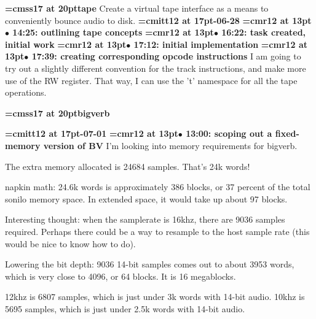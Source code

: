 {\medskip\noindent\bf\font\titlefont=cmss17 at 20pt\titlefont tape}\medskip
Create a virtual tape interface as a means to
conveniently bounce audio to disk.
{\medskip\noindent\bf\font\titlefont=cmitt12 at 17pt-06-28}\medskip
{\smallskip\noindent\bf\font\titlefont=cmr12 at 13pt\titlefont $\bullet$ 14:25: outlining tape concepts}\smallskip
{\smallskip\noindent\bf\font\titlefont=cmr12 at 13pt\titlefont $\bullet$ 16:22: task created, initial work}\smallskip
{\smallskip\noindent\bf\font\titlefont=cmr12 at 13pt\titlefont $\bullet$ 17:12: initial implementation}\smallskip
{\smallskip\noindent\bf\font\titlefont=cmr12 at 13pt\titlefont $\bullet$ 17:39: creating corresponding opcode instructions}\smallskip
I am going to try out a slightly different convention for the track instructions, and make more use of the RW register. That way, I can use the 't' namespace for all the tape operations.
\par

{\medskip\noindent\bf\font\titlefont=cmss17 at 20pt\titlefont bigverb}\medskip

{\medskip\noindent\bf\font\titlefont=cmitt12 at 17pt-07-01}\medskip
{\smallskip\noindent\bf\font\titlefont=cmr12 at 13pt\titlefont $\bullet$ 13:00: scoping out a fixed-memory version of BV}\smallskip
I'm looking into memory requirements for bigverb.
\par

The extra memory allocated is 24684 samples. That's 24k words!
\par

napkin math: 24.6k words is approximately 386 blocks, or 37 percent of the total sonilo memory space. In extended space, it would take up about 97 blocks.
\par

Interesting thought: when the samplerate is 16khz, there are 9036 samples required. Perhaps there could be a way to resample to the host sample rate (this would be nice to know how to do).
\par

Lowering the bit depth: 9036 14-bit samples comes out to about 3953 words, which is very close to 4096, or 64 blocks. It is 16 megablocks.
\par

12khz is 6807 samples, which is just under 3k words with 14-bit audio. 10khz is 5695 samples, which is just under 2.5k words with 14-bit audio.
\par

